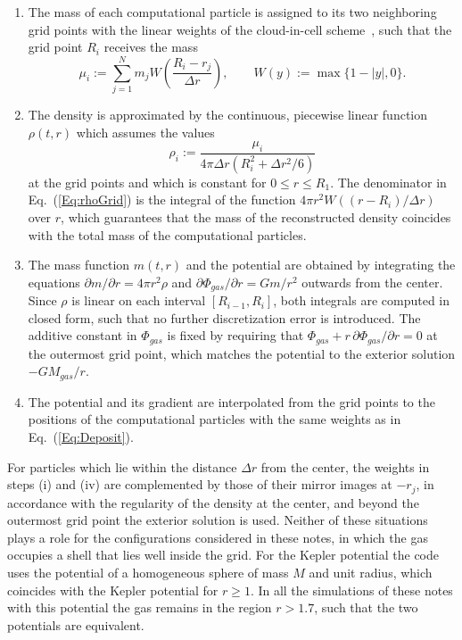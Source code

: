 \begin{enumerate}
\item[(i)] The mass of each computational particle is assigned to its two neighboring grid points with the linear weights of the cloud-in-cell scheme~\cite{BirdsallLangdon-Book,HockneyEastwood-Book}, such that the grid point $R_i$ receives the mass
\begin{equation}
\mu_i := \sum\limits_{j=1}^N m_j W\left( \frac{R_i - r_j}{\Delta r} \right),\qquad
W(y) := \max\{ 1 - |y|,0 \}.
\label{Eq:Deposit}
\end{equation}
\item[(ii)] The density is approximated by the continuous, piecewise linear function $\rho(t,r)$ which assumes the values
\begin{equation}
\rho_i := \frac{\mu_i}{4\pi\Delta r\left( R_i^2 + \Delta r^2/6 \right)}
\label{Eq:rhoGrid}
\end{equation}
at the grid points and which is constant for $0\leq r\leq R_1$. The denominator in Eq.~(\ref{Eq:rhoGrid}) is the integral of the function $4\pi r^2 W((r - R_i)/\Delta r)$ over $r$, which guarantees that the mass of the reconstructed density coincides with the total mass of the computational particles.
\item[(iii)] The mass function $m(t,r)$ and the potential are obtained by integrating the equations $\partial m/\partial r = 4\pi r^2\rho$ and $\partial\Phi_{gas}/\partial r = G m/r^2$ outwards from the center. Since $\rho$ is linear on each interval $[R_{i-1},R_i]$, both integrals are computed in closed form, such that no further discretization error is introduced. The additive constant in $\Phi_{gas}$ is fixed by requiring that $\Phi_{gas} + r\,\partial\Phi_{gas}/\partial r = 0$ at the outermost grid point, which matches the potential to the exterior solution $-G M_{gas}/r$.
\item[(iv)] The potential and its gradient are interpolated from the grid points to the positions of the computational particles with the same weights as in Eq.~(\ref{Eq:Deposit}).
\end{enumerate}
For particles which lie within the distance $\Delta r$ from the center, the weights in steps (i) and (iv) are complemented by those of their mirror images at $-r_j$, in accordance with the regularity of the density at the center, and beyond the outermost grid point the exterior solution is used. Neither of these situations plays a role for the configurations considered in these notes, in which the gas occupies a shell that lies well inside the grid. For the Kepler potential the code uses the potential of a homogeneous sphere of mass $M$ and unit radius, which coincides with the Kepler potential for $r\geq 1$. In all the simulations of these notes with this potential the gas remains in the region $r > 1.7$, such that the two potentials are equivalent.

